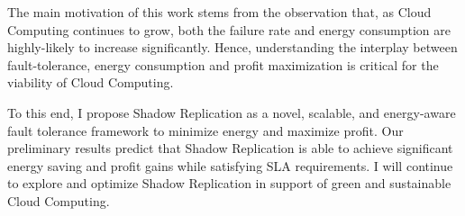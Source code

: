 The main motivation of this work stems from the observation that, as Cloud Computing continues to grow, both the failure rate and energy consumption are highly-likely to increase significantly. Hence, understanding the interplay between fault-tolerance, energy consumption and profit maximization is critical for the viability of Cloud Computing. 

To this end, I propose Shadow Replication as a novel, scalable, and energy-aware fault tolerance framework to minimize energy and maximize profit.
Our preliminary results predict that Shadow Replication is able to achieve significant energy saving and profit gains while satisfying SLA requirements. I will continue to explore and optimize Shadow Replication in support of green and sustainable Cloud Computing.